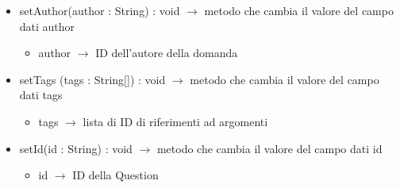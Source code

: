 \begin{description}
\begin{itemize}
	\item setAuthor(author : String) : void $\rightarrow$ metodo che cambia il valore del campo dati author\begin{itemize}
		\item author $\rightarrow$ ID dell'autore della domanda
	\end{itemize}
	
	\item setTags (tags  : String[]) : void $\rightarrow$ metodo che cambia il valore del campo dati tags \begin{itemize}
		\item tags  $\rightarrow$ lista di ID di riferimenti ad argomenti
	\end{itemize}
	
	\item setId(id : String) : void $\rightarrow$ metodo che cambia il valore del campo dati id\begin{itemize}
		\item id $\rightarrow$ ID della Question
	\end{itemize}
	
\end{itemize}

\end{description}


